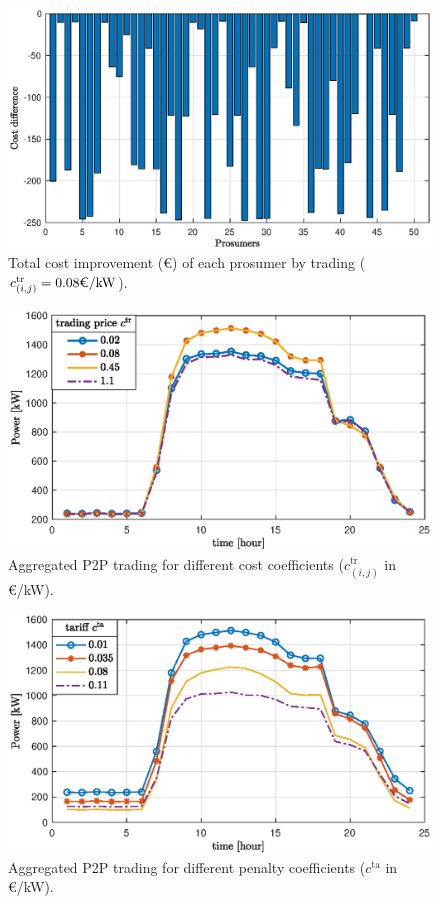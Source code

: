 \documentclass{IEEEtran}  %
\newcommand{\0}{\mathbf{0}}
\newcommand{\1}{\mathbf{1}}
\begin{document}
%	
\begin{figure}[htbp]
	\centering
	\includegraphics[width=.9\linewidth]{figures/b0a.eps}
	\caption{Total cost improvement (\euro) of each prosumer by trading ($c_{(i,j)}^{\mathrm{tr}}=0.08\text{\euro/kW}$).
	}
	\label{fig:simC_cost}
\end{figure}
%
\begin{figure}[htbp]
	\centering
	\includegraphics[width=.9\linewidth]{figures/b1a.eps}
	\caption{Aggregated P2P trading for different cost coefficients ($c_{(i,j)}^{\mathrm{tr}}$ in \euro/kW).
	}
	\label{fig:simC_ctr}
\end{figure}
%
\begin{figure}[t!]
	\centering
	\includegraphics[width=.9\linewidth]{figures/b2a.eps}
	\caption{Aggregated P2P trading for different penalty coefficients ($c^{\mathrm{ta}}$ in \euro/kW).
	}
	\label{fig:simC_pen}
\end{figure}
\end{document}
